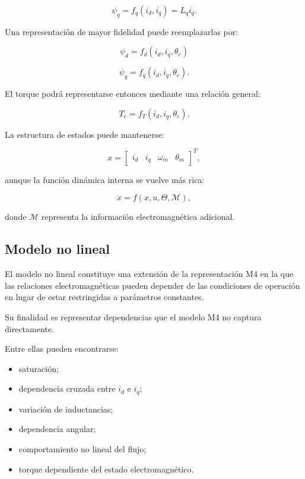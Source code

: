 \begin{equation}
\psi_q=f_q(i_d,i_q)
=
L_qi_q.
\end{equation}

Una representación de mayor fidelidad puede reemplazarlas por:

\begin{equation}
\psi_d=f_d(i_d,i_q,\theta_e)
\end{equation}

\begin{equation}
\psi_q=f_q(i_d,i_q,\theta_e).
\end{equation}

El torque podrá representarse entonces mediante una relación general:

\begin{equation}
T_e=f_T(i_d,i_q,\theta_e).
\end{equation}

La estructura de estados puede mantenerse:

\begin{equation}
x=
\begin{bmatrix}
i_d &
i_q &
\omega_m &
\theta_m
\end{bmatrix}^{T},
\end{equation}

aunque la función dinámica interna se vuelve más rica:

\begin{equation}
\dot{x}=f(x,u,\Theta,\mathcal{M}),
\end{equation}

donde $\mathcal{M}$ representa la información electromagnética adicional.

\subsection{Modelo no lineal}

El modelo no lineal constituye una extensión de la representación M4 en la que las relaciones electromagnéticas pueden depender de las condiciones de operación en lugar de estar restringidas a parámetros constantes.

Su finalidad es representar dependencias que el modelo M4 no captura directamente.

Entre ellas pueden encontrarse:

\begin{itemize}
\item saturación;
\item dependencia cruzada entre $i_d$ e $i_q$;
\item variación de inductancias;
\item dependencia angular;
\item comportamiento no lineal del flujo;
\item torque dependiente del estado electromagnético.
\end{itemize}

